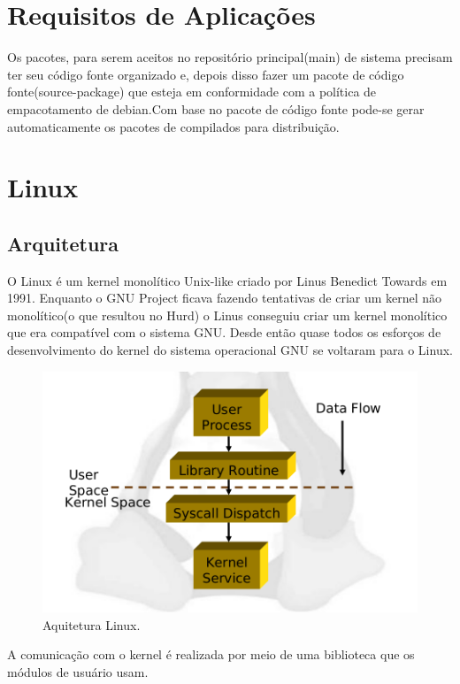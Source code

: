 \documentclass[conference]{IEEEtran}
\begin{document}
\section{Requisitos de Aplicações}\label{sec:req}
Os pacotes, para serem aceitos no repositório principal(main) de sistema precisam ter seu código fonte organizado e, depois disso fazer um pacote de código fonte(source-package) que esteja em conformidade com a política de empacotamento de debian.\cite{DebiankPackaging}Com base no pacote de código fonte pode-se gerar automaticamente os pacotes de compilados para distribuição.
\section{Linux}\label{sec:linux}
\subsection{Arquitetura}\label{sec:LinuxArq}
O Linux é um kernel monolítico Unix-like criado por Linus Benedict Towards em 1991.\cite{LinuxHistory} Enquanto o GNU Project ficava fazendo tentativas de criar um kernel não monolítico(o que resultou no Hurd) o Linus conseguiu criar um kernel monolítico que era compatível com o sistema GNU. Desde então quase todos os esforços de desenvolvimento do kernel do sistema operacional GNU se voltaram para o Linux.\\
\begin{figure}[htb!]
	\centering
	\includegraphics[scale=0.2, trim = 0 -4 0 0,clip = true]{arqtLinux.png}
	\caption{Aquitetura Linux.}
	\label{fig:SisAqrLinux}
\end{figure}
A comunicação com o kernel é realizada por meio de uma biblioteca que os módulos de usuário usam.\\
\end{document}
